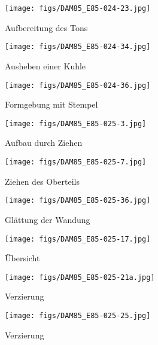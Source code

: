\begin{figure*}[p]
	\centering
	\begin{subfigure}[t]{0.32\textwidth}
		\centering
		\texttt{[image: figs/DAM85\_E85-024-23.jpg]}
		\caption{Aufbereitung des Tons}
		\label{fig:DAM85_Töpferei_a}
	\end{subfigure}
	\begin{subfigure}[t]{0.32\textwidth}
		\centering
		\texttt{[image: figs/DAM85\_E85-024-34.jpg]}
		\caption{Ausheben einer Kuhle}
		\label{fig:DAM85_Töpferei_b}
	\end{subfigure}
	\begin{subfigure}[t]{0.32\textwidth}
		\centering
		\texttt{[image: figs/DAM85\_E85-024-36.jpg]}
		\caption{Formgebung mit Stempel}
		\label{fig:DAM85_Töpferei_d}
	\end{subfigure}
	\begin{subfigure}[t]{0.32\textwidth}
		\centering
		\texttt{[image: figs/DAM85\_E85-025-3.jpg]}
		\caption{Aufbau durch Ziehen}
		\label{fig:DAM85_Töpferei_c}
	\end{subfigure}
	\begin{subfigure}[t]{0.32\textwidth}
		\centering
		\texttt{[image: figs/DAM85\_E85-025-7.jpg]}
		\caption{Ziehen des Oberteils}
		\label{fig:DAM85_Töpferei_e}
	\end{subfigure}
	\begin{subfigure}[t]{0.32\textwidth}
		\centering
		\texttt{[image: figs/DAM85\_E85-025-36.jpg]}
		\caption{Glättung der Wandung}
		\label{fig:DAM85_Töpferei_f}
	\end{subfigure}
	\begin{subfigure}[t]{0.32\textwidth}
		\centering
		\texttt{[image: figs/DAM85\_E85-025-17.jpg]}
		\caption{Übersicht}
		\label{fig:DAM85_Töpferei_g}
	\end{subfigure}
	\begin{subfigure}[t]{0.32\textwidth}
		\centering
		\texttt{[image: figs/DAM85\_E85-025-21a.jpg]}
		\caption{Verzierung}
		\label{fig:DAM85_Töpferei_h}
	\end{subfigure}
	\begin{subfigure}[t]{0.32\textwidth}
		\centering
		\texttt{[image: figs/DAM85\_E85-025-25.jpg]}
		\caption{Verzierung}
		\label{fig:DAM85_Töpferei_i}
	\end{subfigure}
	\begin{subfigure}[t]{0.32\textwidth}

\end{subfigure}
\end{figure*}
